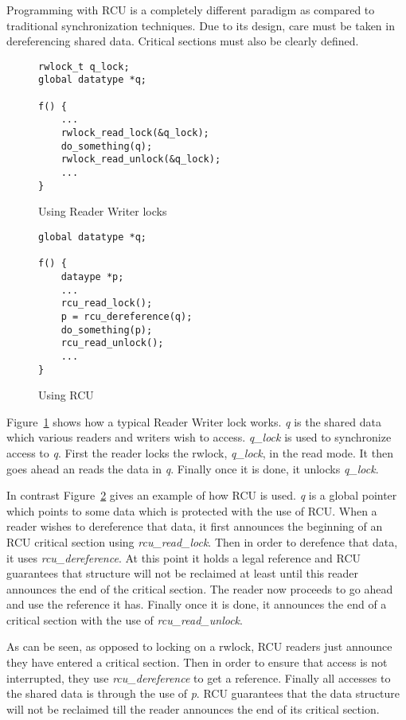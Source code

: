 Programming with RCU is a completely different paradigm as compared to traditional
synchronization techniques. Due to its design, care must be taken in dereferencing
shared data. Critical sections must also be clearly defined.


\begin{figure}[t]
\centering
\begin{lstlisting}
rwlock_t q_lock;
global datatype *q;

f() {
	...
	rwlock_read_lock(&q_lock);
	do_something(q);
	rwlock_read_unlock(&q_lock);
	...
}
\end{lstlisting}
\caption{Using Reader Writer locks}\label{fig:rwuse}
\end{figure}

\begin{figure}[b]
\centering
\begin{lstlisting}
global datatype *q;

f() {
	dataype *p;
	...
	rcu_read_lock();
	p = rcu_dereference(q);
	do_something(p);
	rcu_read_unlock();
	...
}
\end{lstlisting}
\caption{Using RCU}\label{fig:RCUuse}
\end{figure}

Figure~\ref{fig:rwuse} shows how a
typical Reader Writer lock works. \emph{q} is the shared data which various readers
and writers wish to access. \emph{q\_lock} is used to synchronize access to \emph{q}.
First the reader locks the rwlock, \emph{q\_lock},
in the read mode. It then goes ahead an reads the data in \emph{q}. Finally once it is
done, it unlocks \emph{q\_lock}.

In contrast Figure~\ref{fig:RCUuse} gives an example of how RCU is used. \emph{q} is a global pointer
which points to some data which is protected with the use of RCU. When a reader
wishes to dereference that data, it first announces the beginning of an RCU critical
section using \emph{rcu\_read\_lock}. Then in order to derefence that data, it 
uses \emph{rcu\_dereference}. At this
point it holds a legal reference and RCU guarantees that structure will not be
reclaimed at least until this reader announces the end of the critical section.
The reader now proceeds to go ahead and use the reference it has. Finally once it
is done, it announces the end of a critical section with the use of \emph{rcu\_read\_unlock}.

As can be seen, as opposed to locking on a rwlock, RCU readers just announce they
have entered a critical section. Then in order to ensure that access is not
interrupted, they use \emph{rcu\_dereference} to get a reference. Finally all accesses
to the shared data is through the use of \emph{p}. RCU guarantees that the data structure
will not be reclaimed till the reader announces the end of its critical section.

